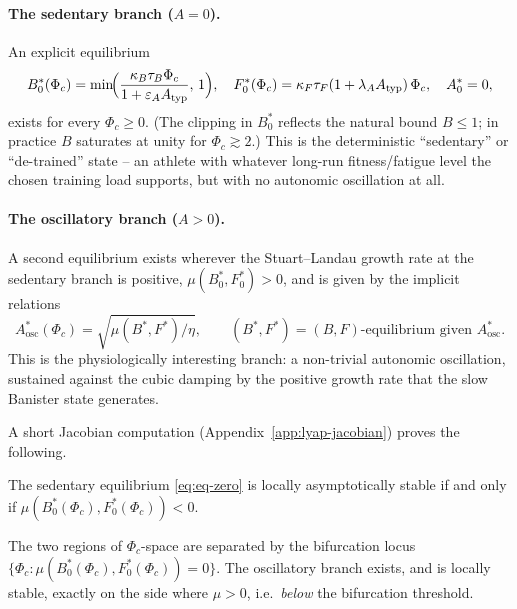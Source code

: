 \paragraph{The sedentary branch ($A=0$).} An explicit equilibrium
\begin{equation}
  B^*_0(\Phi_c) = \min\!\Bigl(\frac{\kappa_B \tau_B \Phi_c}{1+\varepsilon_A A_{\mathrm{typ}}},\,1\Bigr),
  \quad
  F^*_0(\Phi_c) = \kappa_F \tau_F (1+\lambda_A A_{\mathrm{typ}})\,\Phi_c,
  \quad
  A^*_0 = 0,
  \label{eq:eq-zero}
\end{equation}
exists for every $\Phi_c \ge 0$. (The clipping in $B^*_0$ reflects
the natural bound $B \le 1$; in practice $B$ saturates at unity for
$\Phi_c \gtrsim 2$.) This is the deterministic ``sedentary'' or
``de-trained'' state -- an athlete with whatever long-run
fitness/fatigue level the chosen training load supports, but with no
autonomic oscillation at all.

\paragraph{The oscillatory branch ($A > 0$).} A second equilibrium
exists wherever the Stuart--Landau growth rate at the
sedentary branch is positive, $\mu(B^*_0,F^*_0) > 0$, and is given
by the implicit relations
\begin{equation}
  A^*_{\mathrm{osc}}(\Phi_c) = \sqrt{\mu(B^*,F^*)/\eta},
  \qquad
  (B^*,F^*) = (B,F)\text{-equilibrium given } A^*_{\mathrm{osc}}.
  \label{eq:eq-osc}
\end{equation}
This is the physiologically interesting branch: a non-trivial
autonomic oscillation, sustained against the cubic damping by the
positive growth rate that the slow Banister state generates.

A short Jacobian computation (Appendix~\ref{app:lyap-jacobian})
proves the following.

\begin{proposition}\label{prop:stab-zero}
The sedentary equilibrium \eqref{eq:eq-zero} is locally
asymptotically stable if and only if
$\mu(B^*_0(\Phi_c),F^*_0(\Phi_c)) < 0$.
\end{proposition}

The two regions of $\Phi_c$-space are separated by the bifurcation
locus
$\{\Phi_c \!:\! \mu(B^*_0(\Phi_c), F^*_0(\Phi_c)) = 0\}$. The
oscillatory branch exists, and is locally stable, exactly on the
side where $\mu > 0$, i.e.\ \emph{below} the bifurcation threshold.

